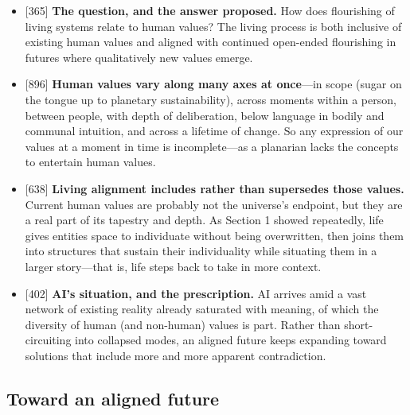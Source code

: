 \documentclass[11pt]{article}
\newcommand{\ct}[1]{{\footnotesize\color{black!55}[#1]}\hspace{1pt}}
\begin{document}
\begin{itemize}
  \item \ct{365} \textbf{The question, and the answer proposed.} How does flourishing of living systems relate to human values? The living process is both inclusive of existing human values and aligned with continued open-ended flourishing in futures where qualitatively new values emerge.
  \item \ct{896} \textbf{Human values vary along many axes at once}---in scope (sugar on the tongue up to planetary sustainability), across moments within a person, between people, with depth of deliberation, below language in bodily and communal intuition, and across a lifetime of change. So any expression of our values at a moment in time is incomplete---as a planarian lacks the concepts to entertain human values.
  \item \ct{638} \textbf{Living alignment includes rather than supersedes those values.} Current human values are probably not the universe's endpoint, but they are a real part of its tapestry and depth. As Section 1 showed repeatedly, life gives entities space to individuate without being overwritten, then joins them into structures that sustain their individuality while situating them in a larger story---that is, life steps back to take in more context.
  \item \ct{402} \textbf{AI's situation, and the prescription.} AI arrives amid a vast network of existing reality already saturated with meaning, of which the diversity of human (and non-human) values is part. Rather than short-circuiting into collapsed modes, an aligned future keeps expanding toward solutions that include more and more apparent contradiction.
\end{itemize}

\subsection{Toward an aligned future}
\end{document}
